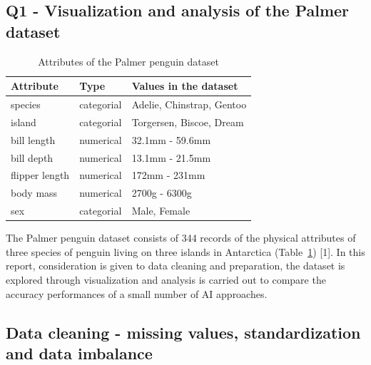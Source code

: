 \documentclass[12pt]{article}
\begin{document}
\subsection*{Q1 - Visualization and analysis of the Palmer dataset}

\begin{table} %
  \small
  \begin{center}
  \vspace{-1\baselineskip} %
  \setlength{\abovecaptionskip}{5pt}
  \setlength{\belowcaptionskip}{5pt}
  \fontsize{10}{10}\selectfont %
  \begin{tabular}{l|l|l}
  Attribute&Type&Values in the dataset\\
  \hline
  species&categorial&Adelie, Chinstrap, Gentoo\\
  island&categorial&Torgersen, Biscoe, Dream\\
  bill length&numerical&32.1mm - 59.6mm\\
  bill depth&numerical&13.1mm - 21.5mm\\
  flipper length&numerical&172mm - 231mm\\
  body mass&numerical&2700g - 6300g\\
  sex&categorial&Male, Female
  \end{tabular}
  \vspace{-1.5\baselineskip} %
  \end{center} 
  \caption{Attributes of the Palmer penguin dataset}
  \vspace{-1\baselineskip} %
  \label{tab:dataset}
\end{table} 

The Palmer penguin dataset consists of 344 records of the physical attributes of three species of penguin living on three islands in Antarctica (Table~\ref{tab:dataset}) [1]. In this report, consideration is given to data cleaning and preparation, the dataset is explored through visualization and analysis is carried out to compare the accuracy performances of a small number of AI approaches. 

\subsection*{Data cleaning - missing values, standardization and data imbalance}
\end{document}
